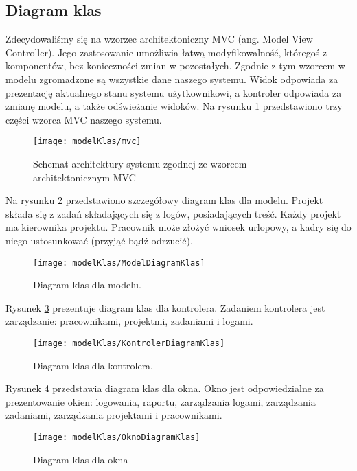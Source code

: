 \subsection{Diagram klas}

Zdecydowaliśmy się na wzorzec architektoniczny MVC (ang. Model View Controller). 
Jego zastosowanie umożliwia łatwą modyfikowalność, któregoś z komponentów, bez                                                                                               
konieczności zmian w pozostałych. Zgodnie z tym wzorcem w modelu zgromadzone są wszystkie dane naszego systemu. 
Widok odpowiada za prezentację aktualnego stanu systemu użytkownikowi, a kontroler odpowiada za zmianę modelu, a także odświeżanie widoków.
Na rysunku \ref{fig:mvc} przedstawiono trzy części wzorca MVC naszego systemu.

\begin{figure}[h]
    \centering
    \texttt{[image: modelKlas/mvc]}
    \caption{Schemat architektury systemu zgodnej ze wzorcem architektonicznym MVC}
    \label{fig:mvc}
\end{figure}

Na rysunku \ref{fig:ModelDiagramKlas} przedstawiono szczegółowy diagram klas dla modelu. Projekt składa się z zadań składających się z logów, posiadających
treść. Każdy projekt ma kierownika projektu. Pracownik może złożyć wniosek urlopowy, a kadry się do niego ustosunkować (przyjąć bądź odrzucić).

\begin{figure}[h]
    \centering
    \texttt{[image: modelKlas/ModelDiagramKlas]}
    \caption{Diagram klas dla modelu.}
    \label{fig:ModelDiagramKlas}
\end{figure}

Rysunek \ref{fig:KontrolerDiagramKlas} prezentuje diagram klas dla kontrolera. Zadaniem kontrolera jest zarządzanie: pracownikami, projektmi, zadaniami i logami.

\begin{figure}[h]
    \centering
    \texttt{[image: modelKlas/KontrolerDiagramKlas]}
    \caption{Diagram klas dla kontrolera.}
    \label{fig:KontrolerDiagramKlas}
\end{figure}

Rysunek \ref{fig:OknoDiagramKlas} przedstawia diagram klas dla okna. 
Okno jest odpowiedzialne za prezentowanie okien: logowania, raportu, zarządzania logami, zarządzania zadaniami, zarządzania projektami i pracownikami.


\begin{figure}[h]
    \centering
    \texttt{[image: modelKlas/OknoDiagramKlas]}
    \caption{Diagram klas dla okna}
    \label{fig:OknoDiagramKlas}
\end{figure}

